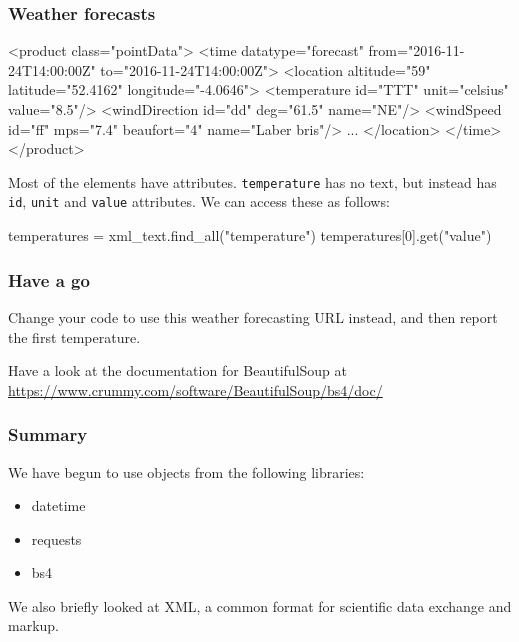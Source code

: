 \documentclass{beamer}
\begin{document}
\begin{frame}[fragile]
\frametitle{Weather forecasts}

\begin{small}
\begin{code} 
  <product class="pointData">
      <time datatype="forecast" from="2016-11-24T14:00:00Z" 
                to="2016-11-24T14:00:00Z">
         <location altitude="59" latitude="52.4162" 
                          longitude="-4.0646">
            <temperature id="TTT" unit="celsius" value="8.5"/>
            <windDirection id="dd" deg="61.5" name="NE"/>
            <windSpeed id="ff" mps="7.4" beaufort="4" 
                                name="Laber bris"/>
            ... 
       </location>
      </time>
   </product>
\end{code}
\end{small}

Most of the elements have attributes. 
\texttt{temperature} has no text, but instead has \texttt{id}, \texttt{unit} and \texttt{value} attributes. 
We can access these as follows:
\begin{code}
temperatures = xml_text.find_all("temperature")
temperatures[0].get("value")
\end{code}
\end{frame}


\begin{frame}[fragile]
\frametitle{Have a go}
Change your code to use this weather forecasting URL instead, and then report the first temperature.

\bigskip

Have a look at the documentation for BeautifulSoup at \url{https://www.crummy.com/software/BeautifulSoup/bs4/doc/}
\end{frame}



\begin{frame}[fragile]
\frametitle{Summary}
We have begun to use objects from the following libraries:
\begin{itemize}
\item datetime
\item requests
\item bs4
\end{itemize}

We also briefly looked at XML, a common format for scientific data exchange and markup.
\end{frame}
\end{document}
